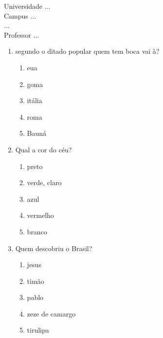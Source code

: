 \documentclass[10pt,a4paper,twocolumn]{report}
\author{...}
\begin{document}
\begin{flushleft}
Universidade ...\\
Campus ...\\
...\\
Professor ...\\
\end{flushleft}




 \begin{enumerate} 
    \item  segundo o ditado popular quem tem boca vai à?





    \begin{enumerate}
    \item  eua

\item  goma

\item  itália

\item  roma

\item  Bauná


    \end{enumerate} 
    \item  Qual a cor do céu?





    \begin{enumerate}
    \item  preto

\item  verde, claro

\item  azul

\item  vermelho

\item  branco


    \end{enumerate} 
    \item  Quem descobriu o Brasil?





    \begin{enumerate}
    \item  jesus

\item  timão

\item  pablo

\item  zeze de camargo

\item  tirulipa


    \end{enumerate}\end{enumerate} 
\end{document}
